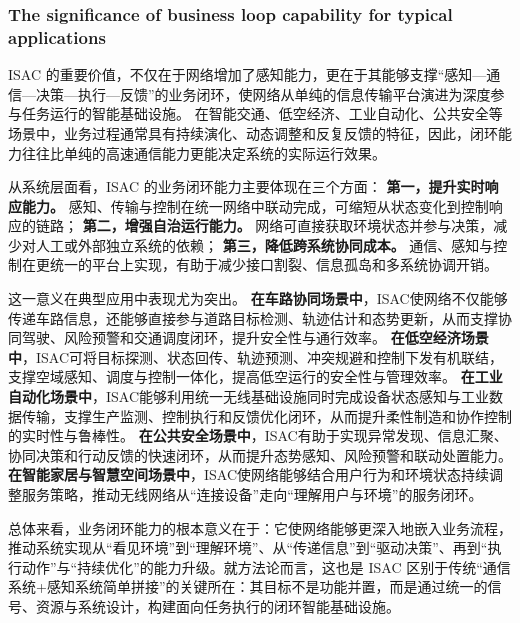\subsubsection{The significance of business loop capability for typical applications}
\label{subsubsec:ch1-isac-core value-closed loop-applications}

ISAC 的重要价值，不仅在于网络增加了感知能力，更在于其能够支撑“感知—通信—决策—执行—反馈”的业务闭环，使网络从单纯的信息传输平台演进为深度参与任务运行的智能基础设施\cite{Liu2022ISAC, Zhang2021ISAC6G, Saad2020Vision6G, ITU2030}。  
在智能交通、低空经济、工业自动化、公共安全等场景中，业务过程通常具有持续演化、动态调整和反复反馈的特征，因此，闭环能力往往比单纯的高速通信能力更能决定系统的实际运行效果。

从系统层面看，ISAC 的业务闭环能力主要体现在三个方面：  
\textbf{第一，提升实时响应能力。} 感知、传输与控制在统一网络中联动完成，可缩短从状态变化到控制响应的链路；  
\textbf{第二，增强自治运行能力。} 网络可直接获取环境状态并参与决策，减少对人工或外部独立系统的依赖；  
\textbf{第三，降低跨系统协同成本。} 通信、感知与控制在更统一的平台上实现，有助于减少接口割裂、信息孤岛和多系统协调开销。

这一意义在典型应用中表现尤为突出。  
\textbf{在车路协同场景中}，ISAC使网络不仅能够传递车路信息，还能够直接参与道路目标检测、轨迹估计和态势更新，从而支撑协同驾驶、风险预警和交通调度闭环，提升安全性与通行效率\cite{Kumari2018IEEE80211adRadar,Ma2026integrated,Feng2020JointRadarCommunication}。  
\textbf{在低空经济场景中}，ISAC可将目标探测、状态回传、轨迹预测、冲突规避和控制下发有机联结，支撑空域感知、调度与控制一体化，提高低空运行的安全性与管理效率\cite{Jiang2025integrated,Meng2023uav}。  
\textbf{在工业自动化场景中}，ISAC能够利用统一无线基础设施同时完成设备状态感知与工业数据传输，支撑生产监测、控制执行和反馈优化闭环，从而提升柔性制造和协作控制的实时性与鲁棒性\cite{Akyildiz2020Industrial6G,Kaushik2024integrated,Sturm2011WaveformDesign}。  
\textbf{在公共安全场景中}，ISAC有助于实现异常发现、信息汇聚、协同决策和行动反馈的快速闭环，从而提升态势感知、风险预警和联动处置能力\cite{Ma2022WiFiSensingSurvey,Liu2022ISAC,Zhang2021ISAC6G}。  
\textbf{在智能家居与智慧空间场景中}，ISAC使网络能够结合用户行为和环境状态持续调整服务策略，推动无线网络从“连接设备”走向“理解用户与环境”的服务闭环\cite{Ma2022WiFiSensingSurvey,Zhang2020device}。

总体来看，业务闭环能力的根本意义在于：它使网络能够更深入地嵌入业务流程，推动系统实现从“看见环境”到“理解环境”、从“传递信息”到“驱动决策”、再到“执行动作”与“持续优化”的能力升级。就方法论而言，这也是 ISAC 区别于传统“通信系统+感知系统简单拼接”的关键所在：其目标不是功能并置，而是通过统一的信号、资源与系统设计，构建面向任务执行的闭环智能基础设施。

